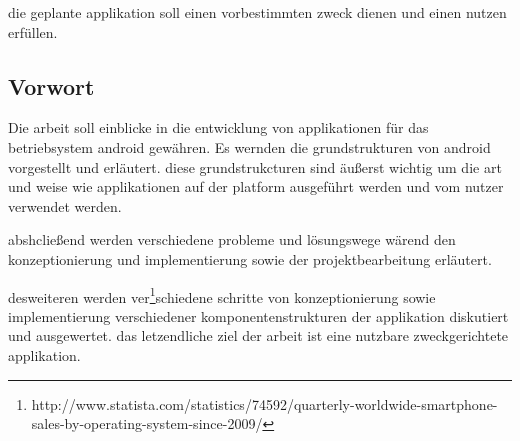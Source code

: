 die geplante applikation soll einen vorbestimmten zweck dienen und einen nutzen erfüllen.

\subsection{Vorwort}
Die arbeit soll einblicke in die entwicklung von applikationen für das betriebsystem android gewähren. Es wernden die grundstrukturen von android vorgestellt und erläutert. diese grundstrukcturen sind äußerst wichtig um die art und weise wie applikationen auf der platform ausgeführt werden und vom nutzer verwendet werden.

abshcließend werden verschiedene probleme und lösungswege wärend den konzeptionierung und implementierung sowie der projektbearbeitung erläutert.

desweiteren werden ver\footnote{http://www.statista.com/statistics/74592/quarterly-worldwide-smartphone-sales-by-operating-system-since-2009/}schiedene schritte von konzeptionierung sowie implementierung verschiedener komponentenstrukturen der applikation diskutiert und ausgewertet. das letzendliche ziel der arbeit ist eine nutzbare zweckgerichtete applikation.


